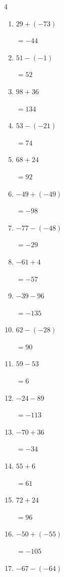 \begin{multicols}{4}
\begin{enumerate}
        $=127$

  \item $29+(-73)$

        $=-44$

  \item $51-(-1)$

        $=52$

  \item $98+36$

        $=134$

  \item $53-(-21)$

        $=74$

  \item $68+24$

        $=92$

  \item $-49+(-49)$

        $=-98$

  \item $-77-(-48)$

        $=-29$

  \item $-61+4$

        $=-57$

  \item $-39-96$

        $=-135$

  \item $62-(-28)$

        $=90$

  \item $59-53$

        $=6$

  \item $-24-89$

        $=-113$

  \item $-70+36$

        $=-34$

\columnbreak %

  \item $55+6$

        $=61$

  \item $72+24$

        $=96$

  \item $-50+(-55)$

        $=-105$

  \item $-67-(-64)$


\end{enumerate}
\end{multicols}
